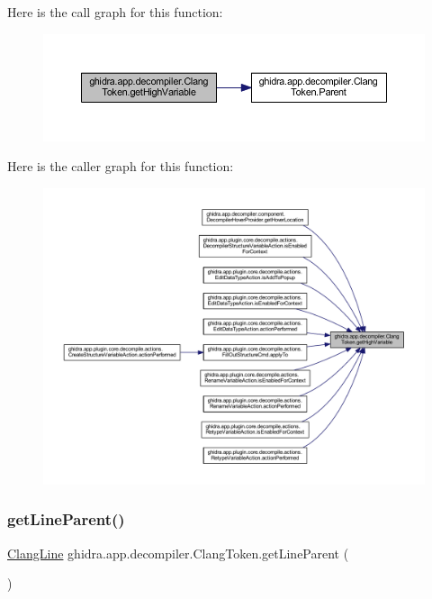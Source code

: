 Here is the call graph for this function\+:
\nopagebreak
\begin{figure}[H]
\begin{center}
\leavevmode
\includegraphics[width=350pt]{classghidra_1_1app_1_1decompiler_1_1_clang_token_ac435f687ea1b950f859e66445763e413_cgraph}
\end{center}
\end{figure}
Here is the caller graph for this function\+:
\nopagebreak
\begin{figure}[H]
\begin{center}
\leavevmode
\includegraphics[width=350pt]{classghidra_1_1app_1_1decompiler_1_1_clang_token_ac435f687ea1b950f859e66445763e413_icgraph}
\end{center}
\end{figure}
\mbox{\label{classghidra_1_1app_1_1decompiler_1_1_clang_token_aea8250f4e75b6fe1cd225ae52fa9a84b}} 
\subsubsection{\texorpdfstring{getLineParent()}{getLineParent()}}
{\footnotesize\ttfamily \mbox{\hyperlink{classghidra_1_1app_1_1decompiler_1_1_clang_line}{Clang\+Line}} ghidra.\+app.\+decompiler.\+Clang\+Token.\+get\+Line\+Parent (\begin{DoxyParamCaption}{ }\end{DoxyParamCaption})\hspace{0.3cm}{\ttfamily [inline]}}



